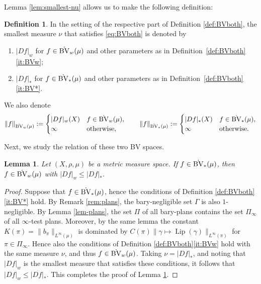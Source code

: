 \documentclass[11pt]{amsart}
\newtheorem{lemma}[theorem]{Lemma}
\theoremstyle{definition}
\newtheorem{definition}[theorem]{Definition}
\theoremstyle{remark}
\numberwithin{equation}{section}
\newcommand{\abs}[1]{|#1|}
\newcommand{\Norm}[2]{\|#1\|_{#2}}
\begin{document}
Lemma \ref{lem:smallest-nu} allows us to make the following definition:

\begin{definition}\label{def:BVboth2}
In the setting of the respective part of Definition \ref{def:BVboth}, the smallest measure
$\nu$ that satisfies \eqref{eq:BVboth} is denoted by
\begin{enumerate}[\rm(i)]
  \item $\abs{Df}_w$ for $f\in\dot{\rm BV}_w(\mu)$ and other parameters as in
  Definition~\ref{def:BVboth}\eqref{it:BVw};
  \item $\abs{Df}_*$ for $f\in\dot{\rm BV}_*(\mu)$ and other parameters as in
  Definition~\ref{def:BVboth}\eqref{it:BV*}.
\end{enumerate}
We also denote
\begin{equation*}
  \Norm{f}{\dot{\rm BV}_w(\mu)}
  :=\begin{cases} \abs{Df}_w(X) & f\in \dot{\rm BV}_w(\mu), \\ \infty &
  \text{otherwise},\end{cases}\qquad
  \Norm{f}{\dot{\rm BV}_*(\mu)}
  :=\begin{cases} \abs{Df}_*(X) & f\in \dot{\rm BV}_*(\mu), \\ \infty &
  \text{otherwise}.\end{cases}
\end{equation*}
\end{definition}


Next, we study the relation of these two BV spaces.

\begin{lemma}\label{lem:tv-c}
Let $(X,\rho,\mu)$ be a metric measure space.
If $f\in \dot{\rm BV}_*(\mu)$, then $f\in \dot{\rm BV}_w(\mu)$
with $|Df|_w\le |Df|_*$.
\end{lemma}

\begin{proof}
Suppose that $f\in\dot{\rm BV}_*(\mu)$, hence the conditions of Definition
\ref{def:BVboth}\eqref{it:BV*} hold. By Remark \ref{rem:plans}, the bary-negligible set
$\Gamma$ is also $1$-negligible. By Lemma \ref{lem-plans}, the set $\Pi$ of all bary-plans
contains the set $\Pi_\infty$ of all $\infty$-test plans. Moreover, by the same lemma the
constant $K(\pi)=\Norm{b_\pi}{L^\infty(\mu)}$ is dominated by
$C(\pi)\Norm{\gamma\mapsto\operatorname{Lip}(\gamma)}{L^\infty(\pi)}$ for
$\pi\in\Pi_\infty$. Hence also the conditions of Definition \ref{def:BVboth}\eqref{it:BVw}
hold with the same measure $\nu$, and thus $f\in\dot{\rm BV}_w(\mu)$. Taking
$\nu=\abs{Df}_*$, and noting that $\abs{Df}_w$ is the smallest measure that satisfies these
conditions, it follows that $\abs{Df}_w\leq\abs{Df}_*$. This completes the proof of Lemma
\ref{lem:tv-c}.
\end{proof}
\end{document}
